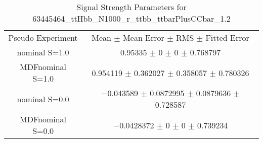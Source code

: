 \begin{table}
\centering
\caption{Signal Strength Parameters for 63445464\_ttHbb\_N1000\_r\_ttbb\_ttbarPlusCCbar\_1.2}
\begin{tabular}{cc}
\toprule
Pseudo Experiment & Mean $\pm$ Mean Error $\pm$ RMS $\pm$ Fitted Error\\
nominal S=1.0 & \num{0.95335} $\pm$ \num{0} $\pm$ \num{0} $\pm$ \num{0.768797}\\
MDFnominal S=1.0 & \num{0.954119} $\pm$ \num{0.362027} $\pm$ \num{0.358057} $\pm$ \num{0.780326}\\
nominal S=0.0 & \num{-0.043589} $\pm$ \num{0.0872995} $\pm$ \num{0.0879636} $\pm$ \num{0.728587}\\
MDFnominal S=0.0 & \num{-0.0428372} $\pm$ \num{0} $\pm$ \num{0} $\pm$ \num{0.739234}\\
\bottomrule
\end{tabular}
\end{table}
